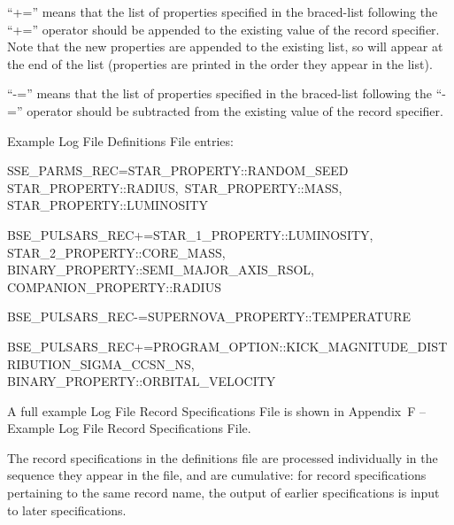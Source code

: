 \bigskip
\hfill
\begin{minipage}{\dimexpr\textwidth-1.5cm}
``+='' means that the list of properties specified in the braced-list following the ``+='' operator should be appended to the existing value of the record specifier. Note that the new properties are appended to the existing list, so will appear at the end of the list (properties are printed in the order they appear in the list).
\end{minipage}

\bigskip
\hfill
\begin{minipage}{\dimexpr\textwidth-1.5cm}
``-='' means that the list of properties specified in the braced-list following the ``-='' operator should be subtracted from the existing value of the record specifier.
\end{minipage}

\bigskip
Example Log File Definitions File entries:
\bigskip

\small
SSE\_PARMS\_REC\tabto{9.65em}=\tabto{11em}\lcb\tabto{11.6em}STAR\_PROPERTY::RANDOM\_SEED \\
\tabto{11.6em}STAR\_PROPERTY::RADIUS,\ STAR\_PROPERTY::MASS,
\tabto{11.6em}STAR\_PROPERTY::LUMINOSITY\ \rcb

\medskip
BSE\_PULSARS\_REC\tabto{9em}+=\tabto{11em}\lcb\tabto{11.6em}STAR\_1\_PROPERTY::LUMINOSITY, \\
\tabto{11.6em}STAR\_2\_PROPERTY::CORE\_MASS, \\
\tabto{11.6em}BINARY\_PROPERTY::SEMI\_MAJOR\_AXIS\_RSOL, \\
\tabto{11.6em}COMPANION\_PROPERTY::RADIUS\ \rcb

\medskip
BSE\_PULSARS\_REC\tabto{9em}-=\tabto{11em}\lcb\tabto{11.6em}SUPERNOVA\_PROPERTY::TEMPERATURE\ \rcb

\medskip
BSE\_PULSARS\_REC\tabto{9em}+=\tabto{11em}\lcb\tabto{11.6em}PROGRAM\_OPTION::KICK\_MAGNITUDE\_DISTRIBUTION\_SIGMA\_CCSN\_NS,
\tabto{11.6em}BINARY\_PROPERTY::ORBITAL\_VELOCITY\ \rcb

\normalsize

\bigskip 
A full example Log File Record Specifications File is shown in Appendix~F -- Example Log File Record Specifications File.

The record specifications in the definitions file are processed individually in the sequence they appear in the file, and are cumulative: for record specifications pertaining to the same record name, the output of earlier specifications is input to later specifications.

